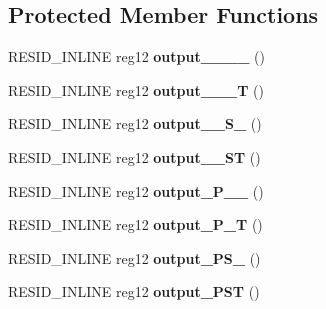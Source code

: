 \subsection*{Protected Member Functions}
\begin{DoxyCompactItemize}
\item 
\hypertarget{classWaveformGenerator_a41faf401110f9314634bff69802ca8c1}{R\-E\-S\-I\-D\-\_\-\-I\-N\-L\-I\-N\-E reg12 {\bfseries output\-\_\-\-\_\-\-\_\-\-\_\-} ()}\label{classWaveformGenerator_a41faf401110f9314634bff69802ca8c1}

\item 
\hypertarget{classWaveformGenerator_a3ce5908b0707900a41eda01c17c63314}{R\-E\-S\-I\-D\-\_\-\-I\-N\-L\-I\-N\-E reg12 {\bfseries output\-\_\-\-\_\-\-\_\-\-T} ()}\label{classWaveformGenerator_a3ce5908b0707900a41eda01c17c63314}

\item 
\hypertarget{classWaveformGenerator_aee428e2db0d63e6032a2e8b4612c5f65}{R\-E\-S\-I\-D\-\_\-\-I\-N\-L\-I\-N\-E reg12 {\bfseries output\-\_\-\-\_\-\-S\-\_\-} ()}\label{classWaveformGenerator_aee428e2db0d63e6032a2e8b4612c5f65}

\item 
\hypertarget{classWaveformGenerator_ab4d505a2bb294528a8bbba171f5d3176}{R\-E\-S\-I\-D\-\_\-\-I\-N\-L\-I\-N\-E reg12 {\bfseries output\-\_\-\-\_\-\-S\-T} ()}\label{classWaveformGenerator_ab4d505a2bb294528a8bbba171f5d3176}

\item 
\hypertarget{classWaveformGenerator_a27e7394a682eafbbb444a7c8f76a961d}{R\-E\-S\-I\-D\-\_\-\-I\-N\-L\-I\-N\-E reg12 {\bfseries output\-\_\-\-P\-\_\-\-\_\-} ()}\label{classWaveformGenerator_a27e7394a682eafbbb444a7c8f76a961d}

\item 
\hypertarget{classWaveformGenerator_ae11a04314b6ffcf56e67186a0f618e32}{R\-E\-S\-I\-D\-\_\-\-I\-N\-L\-I\-N\-E reg12 {\bfseries output\-\_\-\-P\-\_\-\-T} ()}\label{classWaveformGenerator_ae11a04314b6ffcf56e67186a0f618e32}

\item 
\hypertarget{classWaveformGenerator_a9f5b2fcef1c619b4664b454c73c1697b}{R\-E\-S\-I\-D\-\_\-\-I\-N\-L\-I\-N\-E reg12 {\bfseries output\-\_\-\-P\-S\-\_\-} ()}\label{classWaveformGenerator_a9f5b2fcef1c619b4664b454c73c1697b}

\item 
\hypertarget{classWaveformGenerator_a6cbeb24bb632ecd46a67ff696468dd4c}{R\-E\-S\-I\-D\-\_\-\-I\-N\-L\-I\-N\-E reg12 {\bfseries output\-\_\-\-P\-S\-T} ()}\label{classWaveformGenerator_a6cbeb24bb632ecd46a67ff696468dd4c}


\end{DoxyCompactItemize}
